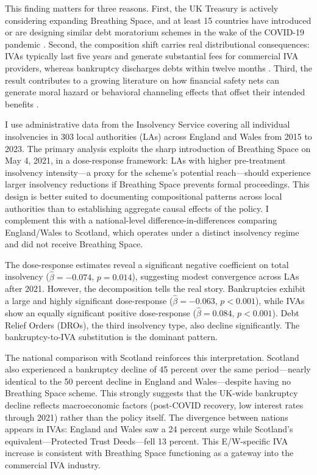 \documentclass[12pt]{article}
\begin{document}
This finding matters for three reasons. First, the UK Treasury is actively considering expanding Breathing Space, and at least 15 countries have introduced or are designing similar debt moratorium schemes in the wake of the COVID-19 pandemic \citep{worldbank2021}. Second, the composition shift carries real distributional consequences: IVAs typically last five years and generate substantial fees for commercial IVA providers, whereas bankruptcy discharges debts within twelve months \citep{walters2019}. Third, the result contributes to a growing literature on how financial safety nets can generate moral hazard or behavioral channeling effects that offset their intended benefits \citep{mahoney2015, dobbie2015, dinerstein2024}.

I use administrative data from the Insolvency Service covering all individual insolvencies in 303 local authorities (LAs) across England and Wales from 2015 to 2023. The primary analysis exploits the sharp introduction of Breathing Space on May 4, 2021, in a dose-response framework: LAs with higher pre-treatment insolvency intensity---a proxy for the scheme's potential reach---should experience larger insolvency reductions if Breathing Space prevents formal proceedings. This design is better suited to documenting compositional patterns across local authorities than to establishing aggregate causal effects of the policy. I complement this with a national-level difference-in-differences comparing England/Wales to Scotland, which operates under a distinct insolvency regime and did not receive Breathing Space.

The dose-response estimates reveal a significant negative coefficient on total insolvency ($\hat{\beta} = -0.074$, $p = 0.014$), suggesting modest convergence across LAs after 2021. However, the decomposition tells the real story. Bankruptcies exhibit a large and highly significant dose-response ($\hat{\beta} = -0.063$, $p < 0.001$), while IVAs show an equally significant positive dose-response ($\hat{\beta} = 0.084$, $p < 0.001$). Debt Relief Orders (DROs), the third insolvency type, also decline significantly. The bankruptcy-to-IVA substitution is the dominant pattern.

The national comparison with Scotland reinforces this interpretation. Scotland also experienced a bankruptcy decline of 45 percent over the same period---nearly identical to the 50 percent decline in England and Wales---despite having no Breathing Space scheme. This strongly suggests that the UK-wide bankruptcy decline reflects macroeconomic factors (post-COVID recovery, low interest rates through 2021) rather than the policy itself. The divergence between nations appears in IVAs: England and Wales saw a 24 percent surge while Scotland's equivalent---Protected Trust Deeds---fell 13 percent. This E/W-specific IVA increase is consistent with Breathing Space functioning as a gateway into the commercial IVA industry.
\end{document}
